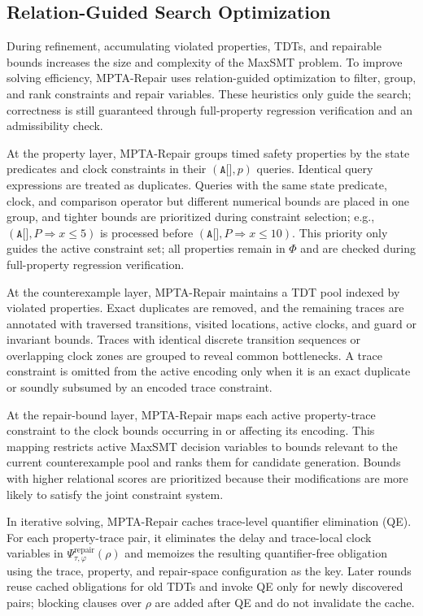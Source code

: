 \subsection{Relation-Guided Search Optimization}

During refinement, accumulating violated properties, TDTs, and
repairable bounds increases the size and complexity of the MaxSMT
problem. To improve solving efficiency, MPTA-Repair uses
relation-guided optimization to filter,
group, and rank constraints and repair variables. These heuristics only
guide the search; correctness is still guaranteed through full-property
regression verification and an admissibility check.

At the property layer, MPTA-Repair groups timed safety properties by
the state predicates and clock constraints in their $(\texttt{A[]},p)$
queries. Identical query expressions are treated as duplicates. Queries
with the same state predicate, clock, and comparison operator but
different numerical bounds are placed in one group, and tighter bounds
are prioritized during constraint selection; e.g.,
$(\texttt{A[]}, P \Rightarrow x \le 5)$ is processed before
$(\texttt{A[]}, P \Rightarrow x \le 10)$. This priority only guides the
active constraint set; all properties remain in $\Phi$ and are checked
during full-property regression verification.

At the counterexample layer, MPTA-Repair maintains a TDT pool indexed by
violated properties. Exact duplicates are removed, and the remaining
traces are annotated with traversed transitions, visited locations,
active clocks, and guard or invariant bounds. Traces with identical
discrete transition sequences or overlapping clock zones are grouped to
reveal common bottlenecks. A trace constraint is omitted from the active
encoding only when it is an exact duplicate or soundly subsumed by an
encoded trace constraint.

At the repair-bound layer, MPTA-Repair maps each active property-trace
constraint to the clock bounds occurring in or affecting its encoding.
This mapping restricts active MaxSMT decision variables to bounds
relevant to the current counterexample pool and ranks them for candidate
generation. Bounds with higher relational scores are prioritized
because their modifications are more likely to satisfy the joint
constraint system.

In iterative solving, MPTA-Repair caches trace-level quantifier
elimination (QE). For each property-trace pair, it eliminates the delay
and trace-local clock variables in
$\Psi_{\tau,\varphi}^{\mathrm{repair}}(\rho)$ and memoizes the resulting
quantifier-free obligation using the trace, property, and repair-space
configuration as the key. Later rounds reuse cached obligations for old
TDTs and invoke QE only for newly discovered pairs; blocking clauses over
$\rho$ are added after QE and do not invalidate the cache.

